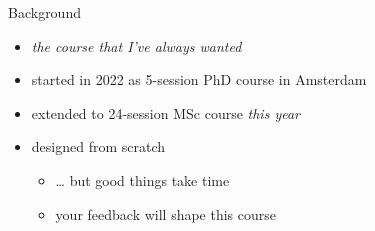 \documentclass[aspectratio=169,mathserif]{beamer}
\begin{document}

\begin{frame}{Background}

        \begin{itemize}
        \item \emph{the course that I've always wanted}
        \item started in 2022 as 5-session PhD course in Amsterdam
        \item extended to 24-session MSc course \emph{this year} 
        \item designed from scratch
        \begin{itemize}
          \item \dots{} but good things take time
          \item your feedback will shape this course     
        \end{itemize} 
        \end{itemize}

\end{frame}
\end{document}
